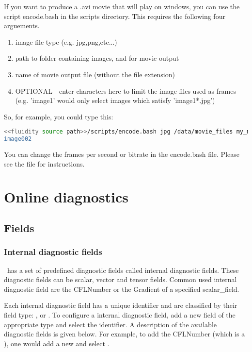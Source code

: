 If you want to produce a .avi movie that will play on windows, you can use the script  encode.bash in the scripts directory. This requires the following four arguements.
\begin{enumerate}
\item image file type (e.g. jpg,png,etc...)   
\item path to folder containing images, and for movie output
\item name of movie output file (without the file extension)
\item OPTIONAL - enter characters here to limit the image files used as frames (e.g. 'image1' would only select images which satisfy 'image1*.jpg')
\end{enumerate}
So, for example, you could type this:
\begin{lstlisting}[language=bash]
<<fluidity source path>>/scripts/encode.bash jpg /data/movie_files my_movie 
image002
\end{lstlisting}
You can change the frames per second or bitrate in the encode.bash file. Please see the file for instructions.



\section{Online diagnostics}
\label{sect:online_diagnostics}

\subsection{Fields}
\label{sect:diagnostics_fields}

\subsubsection{Internal diagnostic fields}
\fluidity\ has a set of predefined diagnostic fields called internal diagnostic fields. These diagnostic fields can be scalar, vector and tensor fields. Common used internal diagnostic field are the CFLNumber or the Gradient of a specified scalar\_field.


Each internal diagnostic field has a unique identifier and are classified by their field type: , 
or . To configure a internal diagnostic field, add a new field of the appropriate type and select the identifier. A description of the available diagnostic fields is given below. For example, to add the CFLNumber (which is a ), one would add a new  and select . 

